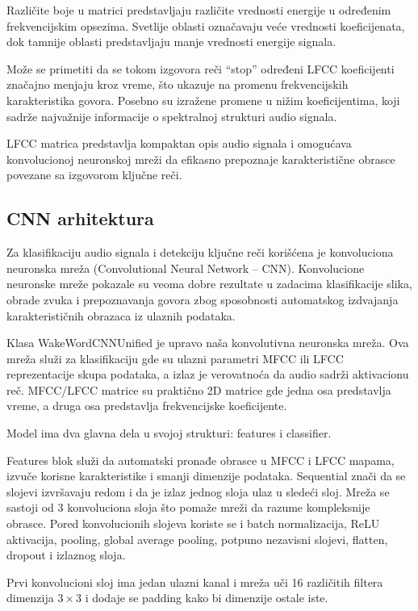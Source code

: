 \documentclass[a4paper,12pt]{article}
\begin{document}
Različite boje u matrici predstavljaju različite vrednosti energije u određenim frekvencijskim opsezima. Svetlije oblasti označavaju veće vrednosti koeficijenata, dok tamnije oblasti predstavljaju manje vrednosti energije signala.

Može se primetiti da se tokom izgovora reči ``stop'' određeni LFCC koeficijenti značajno menjaju kroz vreme, što ukazuje na promenu frekvencijskih karakteristika govora. Posebno su izražene promene u nižim koeficijentima, koji sadrže najvažnije informacije o spektralnoj strukturi audio signala.

LFCC matrica predstavlja kompaktan opis audio signala i omogućava konvolucionoj neuronskoj mreži da efikasno prepoznaje karakteristične obrasce povezane sa izgovorom ključne reči.



\subsection{CNN arhitektura}

Za klasifikaciju audio signala i detekciju ključne reči korišćena je konvoluciona neuronska mreža (Convolutional Neural Network -- CNN). Konvolucione neuronske mreže pokazale su veoma dobre rezultate u zadacima klasifikacije slika, obrade zvuka i prepoznavanja govora zbog sposobnosti automatskog izdvajanja karakterističnih obrazaca iz ulaznih podataka.

Klasa WakeWordCNNUnified je upravo naša konvolutivna neuronska mreža. Ova mreža služi za klasifikaciju gde su ulazni parametri MFCC ili LFCC reprezentacije skupa podataka, a izlaz je verovatnoća da audio sadrži aktivacionu reč. MFCC/LFCC matrice su praktično 2D matrice gde jedna osa predstavlja vreme, a druga osa predstavlja frekvencijske koeficijente.

Model ima dva glavna dela u svojoj strukturi: features i classifier.

Features blok služi da automatski pronađe obrasce u MFCC i LFCC mapama, izvuče korisne karakteristike i smanji dimenzije podataka. Sequential znači da se slojevi izvršavaju redom i da je izlaz jednog sloja ulaz u sledeći sloj. Mreža se sastoji od 3 konvoluciona sloja što pomaže mreži da razume kompleksnije obrasce. Pored konvolucionih slojeva koriste se i batch normalizacija, ReLU aktivacija, pooling, global average pooling, potpuno nezavisni slojevi, flatten, dropout i izlaznog sloja.


Prvi konvolucioni sloj ima jedan ulazni kanal i mreža uči 16 različitih filtera dimenzija  \(3 \times 3\) i dodaje se padding kako bi dimenzije ostale iste.
\end{document}
